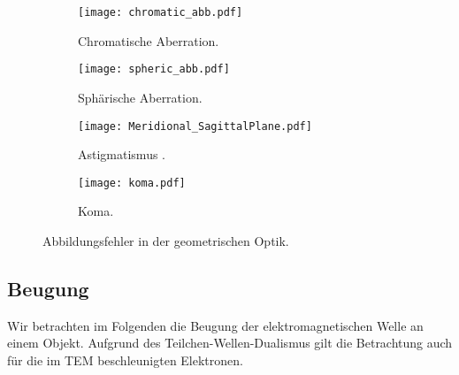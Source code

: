 \begin{figure}[h]
	\centering
	\begin{subfigure}[b]{0.45\textwidth}
		\centering
		\texttt{[image: chromatic\_abb.pdf]}
		\caption{Chromatische Aberration.}
		\label{fig:chromatic_abb}
	\end{subfigure}
	\hfill
	\begin{subfigure}[b]{0.45\textwidth}
		\centering
		\texttt{[image: spheric\_abb.pdf]}
		\caption{Sphärische Aberration.}
		\label{fig:spheric_abb}
	\end{subfigure}
	
	\begin{subfigure}[b]{0.45\textwidth}
		\centering
		\texttt{[image: Meridional\_SagittalPlane.pdf]}
		\caption{Astigmatismus \cite{lit:wiki_astigma}.}
		\label{fig:astigmatismus}
	\end{subfigure}
	\hfill
	\begin{subfigure}[b]{0.45\textwidth}
		\centering
		\texttt{[image: koma.pdf]}
		\caption{Koma.}
		\label{fig:koma}
	\end{subfigure}
	\caption{Abbildungsfehler in der geometrischen Optik.}
	\vspace{-3em}
\end{figure}

\subsection{Beugung}
Wir betrachten im Folgenden die Beugung der elektromagnetischen Welle an einem Objekt. Aufgrund des Teilchen-Wellen-Dualismus gilt die Betrachtung auch für die im TEM beschleunigten Elektronen.
